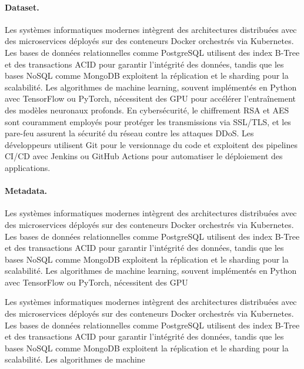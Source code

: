 \paragraph{Dataset.}
\label{par:eval-dataset}
Les systèmes informatiques modernes intègrent des architectures distribuées avec des microservices déployés sur des conteneurs Docker orchestrés via Kubernetes. Les bases de données relationnelles comme PostgreSQL utilisent des index B-Tree et des transactions ACID pour garantir l'intégrité des données, tandis que les bases NoSQL comme MongoDB exploitent la réplication et le sharding pour la scalabilité. Les algorithmes de machine learning, souvent implémentés en Python avec TensorFlow ou PyTorch, nécessitent des GPU pour accélérer l'entraînement des modèles neuronaux profonds. En cybersécurité, le chiffrement RSA et AES sont couramment employés pour protéger les transmissions via SSL/TLS, et les pare-feu assurent la sécurité du réseau contre les attaques DDoS. Les développeurs utilisent Git pour le versionnage du code et exploitent des pipelines CI/CD avec Jenkins ou GitHub Actions pour automatiser le déploiement des applications.

\paragraph{Metadata.}
\label{par:eval-metadata}
Les systèmes informatiques modernes intègrent des architectures distribuées avec des microservices déployés sur des conteneurs Docker orchestrés via Kubernetes. Les bases de données relationnelles comme PostgreSQL utilisent des index B-Tree et des transactions ACID pour garantir l'intégrité des données, tandis que les bases NoSQL comme MongoDB exploitent la réplication et le sharding pour la scalabilité. Les algorithmes de machine learning, souvent implémentés en Python avec TensorFlow ou PyTorch, nécessitent des GPU 




Les systèmes informatiques modernes intègrent des architectures distribuées avec des microservices déployés sur des conteneurs Docker orchestrés via Kubernetes. Les bases de données relationnelles comme PostgreSQL utilisent des index B-Tree et des transactions ACID pour garantir l'intégrité des données, tandis que les bases NoSQL comme MongoDB exploitent la réplication et le sharding pour la scalabilité. Les algorithmes de machine 



